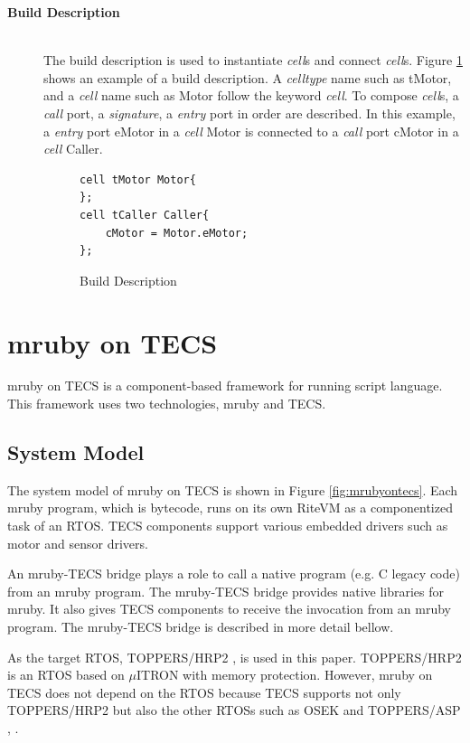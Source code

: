 \documentclass[a4j,12pt,oneside,openany,english]{jsbook}
\begin{document}
\begin{description}
    \item[{\bf Build Description}]\mbox{}\\
        The build description is used to instantiate {\it cell}s and connect {\it cell}s.
        Figure \ref{build} shows an example of a build description.
        A {\it celltype} name such as tMotor, and a {\it cell} name such as Motor follow the keyword {\it cell}.
        To compose {\it cell}s, a {\it call} port, a {\it signature}, a {\it entry} port in order are described.
        In this example, a {\it entry} port eMotor in a {\it cell} Motor is connected to a {\it call} port cMotor in a {\it cell} Caller.\\
\begin{figure}[t]
\centering
\begin{lstlisting}
cell tMotor Motor{
};
cell tCaller Caller{
    cMotor = Motor.eMotor;
};
\end{lstlisting}
\caption{Build Description}
\label{build}
\end{figure}

\end{description}

\section{mruby on TECS}
\label{sec:mruby on TECS}
mruby on TECS is a component-based framework for running script language.
This framework uses two technologies, mruby and TECS.

\subsection{System Model}

The system model of mruby on TECS is shown in Figure \ref{fig:mrubyontecs}.
Each mruby program, which is bytecode, runs on its own RiteVM as a componentized task of an RTOS.
TECS components support various embedded drivers such as motor and sensor drivers.

An mruby-TECS bridge plays a role to call a native program (e.g. C legacy code) from an mruby program.
The mruby-TECS bridge provides native libraries for mruby.
It also gives TECS components to receive the invocation from an mruby program.
The mruby-TECS bridge is described in more detail bellow.

As the target RTOS, TOPPERS/HRP2 \cite{url:HRP2}, \cite{par:hr-tecs} is used in this paper.
TOPPERS/HRP2 is an RTOS based on $\mu$ITRON \cite{par:microITRON} with memory protection.
However, mruby on TECS does not depend on the RTOS because TECS supports not only TOPPERS/HRP2 but also the other RTOSs such as OSEK \cite{par:OSEK} and TOPPERS/ASP \cite{par:ASP}, \cite{url:ASP}.
\end{document}
